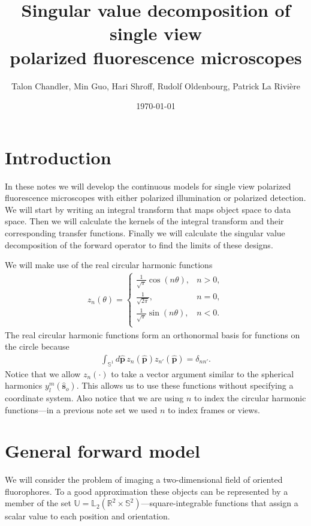 \documentclass[11pt]{article}
\providecommand{\so}[1]{\mathbf{\hat{s}}_o}
\providecommand{\mh}[1]{\mathbf{\hat{#1}}}
\providecommand{\mbb}[1]{\mathbb{#1}}
\begin{document}
\title{\vspace{-2.5em} Singular value decomposition of single view\\ polarized
  fluorescence microscopes\vspace{-1em}} \author{Talon Chandler, Min Guo, Hari
  Shroff, Rudolf Oldenbourg, Patrick La Rivi\`ere}
\date{\vspace{-1em}\today\vspace{-1em}}
\maketitle
\section{Introduction}
In these notes we will develop the continuous models for single view polarized
fluorescence microscopes with either polarized illumination or polarized
detection. We will start by writing an integral transform that maps object space
to data space. Then we will calculate the kernels of the integral transform and
their corresponding transfer functions. Finally we will calculate the singular
value decomposition of the forward operator to find the limits of these designs.

\noindent We will make use of the real circular harmonic functions
\begin{align}
  z_n(\theta) =
  \begin{cases}
    \frac{1}{\sqrt{\pi}}\cos(n\theta), & n > 0,\\
    \frac{1}{\sqrt{2\pi}}, & n = 0,\\
    \frac{1}{\sqrt{\pi}}\sin(n\theta), & n < 0.\\
  \end{cases}
\end{align}
The real circular harmonic functions form an orthonormal basis for functions on
the circle because
\begin{align}
  \int_{\mbb{S}^1}d\mh{p}\, z_n(\mh{p})z_{n'}(\mh{p}) = \delta_{nn'}.
\end{align}
Notice that we allow $z_n(\cdot)$ to take a vector argument similar to the
spherical harmonics $y_l^m(\so{})$. This allows us to use these functions
without specifying a coordinate system. Also notice that we are using $n$ to
index the circular harmonic functions---in a previous note set we used $n$ to
index frames or views.

\section{General forward model}
We will consider the problem of imaging a two-dimensional field of oriented
fluorophores. To a good approximation these objects can be represented by a
member of the set
$\mbb{U} = \mbb{L}_2(\mbb{R}^2 \times \mbb{S}^2)$---square-integrable functions
that assign a scalar value to each position and orientation.
\end{document}
